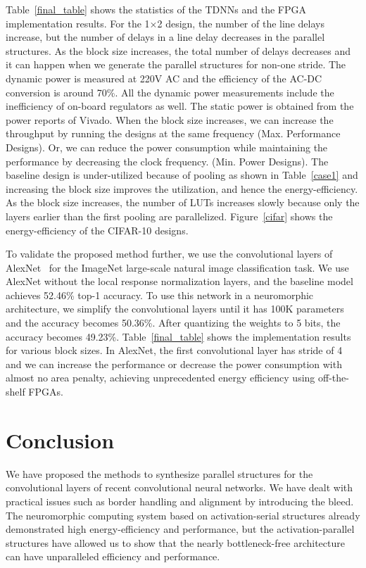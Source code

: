 \documentclass[journal]{IEEEtran}
\begin{document}
 Table~\ref{final_table} shows the statistics of the TDNNs and the FPGA implementation results. For the 1$\times$2 design, the number of the line delays increase, but the number of delays in a line delay decreases in the parallel structures. As the block size increases, the total number of delays decreases and it can happen when we generate the parallel structures for non-one stride. The dynamic power is measured at 220V AC and the efficiency of the AC-DC conversion is around 70\%. All the dynamic power measurements include the inefficiency of on-board regulators as well. The static power is obtained from the power reports of Vivado. When the block size increases, we can increase the throughput by running the designs at the same frequency (Max. Performance Designs). Or, we can reduce the power consumption while maintaining the performance by decreasing the clock frequency. (Min. Power Designs). The baseline design is under-utilized because of pooling as shown in Table~\ref{case1} and increasing the block size improves the utilization, and hence the energy-efficiency. As the block size increases, the number of LUTs increases slowly because only the layers earlier than the first pooling are parallelized. Figure~\ref{cifar} shows the energy-efficiency of the CIFAR-10 designs.


 To validate the proposed method further, we use the convolutional layers of AlexNet~\cite{krizhevsky2012imagenet} for the ImageNet large-scale natural image classification task. We use AlexNet without the local response normalization layers, and the baseline model achieves 52.46\% top-1 accuracy. To use this network in a neuromorphic architecture, we simplify the convolutional layers until it has 100K parameters and the accuracy becomes 50.36\%. After quantizing the weights to 5 bits, the accuracy becomes 49.23\%. Table~\ref{final_table} shows the implementation results for various block sizes. In AlexNet, the first convolutional layer has stride of 4 and we can increase the performance or decrease the power consumption with almost no area penalty, achieving unprecedented energy efficiency using off-the-shelf FPGAs.

\section{Conclusion}
We have proposed the methods to synthesize parallel structures for the convolutional layers of recent convolutional neural networks. We have dealt with practical issues such as border handling and alignment by introducing the bleed. The neuromorphic computing system based on activation-serial structures already demonstrated high energy-efficiency and performance, but the activation-parallel structures have allowed us to show that the nearly bottleneck-free architecture can have unparalleled efficiency and performance.    

\ifCLASSOPTIONcaptionsoff
  \newpage
\fi

 

\end{document}
